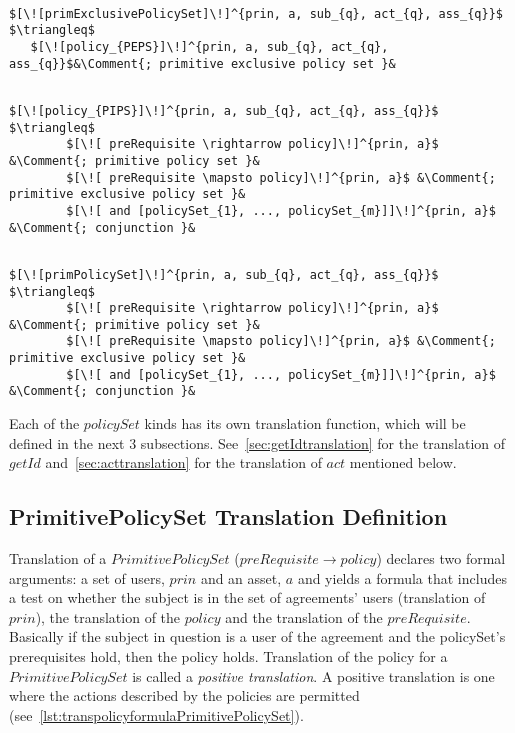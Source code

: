 \lstset{mathescape, language=AST}  
\begin{lstlisting}[frame=single, caption={Primitive Policy Set Translation Cases},label={lst:transpolicysetdefinitionAST}]

$[\![primExclusivePolicySet]\!]^{prin, a, sub_{q}, act_{q}, ass_{q}}$ $\triangleq$ 
   $[\![policy_{PEPS}]\!]^{prin, a, sub_{q}, act_{q}, ass_{q}}$&\Comment{; primitive exclusive policy set }&
\end{lstlisting}

\lstset{mathescape, language=AST}  
\begin{lstlisting}[frame=single, caption={Primitive Policy Set Translation Cases},label={lst:transpolicysetdefinitionAST}]

$[\![policy_{PIPS}]\!]^{prin, a, sub_{q}, act_{q}, ass_{q}}$ $\triangleq$ 
        $[\![ preRequisite \rightarrow policy]\!]^{prin, a}$ &\Comment{; primitive policy set }&
        $[\![ preRequisite \mapsto policy]\!]^{prin, a}$ &\Comment{; primitive exclusive policy set }&
        $[\![ and [policySet_{1}, ..., policySet_{m}]]\!]^{prin, a}$ &\Comment{; conjunction }&

\end{lstlisting}


\lstset{mathescape, language=AST}  
\begin{lstlisting}[frame=single, caption={Primitive Policy Set Translation Cases},label={lst:transpolicysetdefinitionAST}]

$[\![primPolicySet]\!]^{prin, a, sub_{q}, act_{q}, ass_{q}}$ $\triangleq$ 
        $[\![ preRequisite \rightarrow policy]\!]^{prin, a}$ &\Comment{; primitive policy set }&
        $[\![ preRequisite \mapsto policy]\!]^{prin, a}$ &\Comment{; primitive exclusive policy set }&
        $[\![ and [policySet_{1}, ..., policySet_{m}]]\!]^{prin, a}$ &\Comment{; conjunction }&

\end{lstlisting}

Each of the $policySet$ kinds has its own translation function, which will be defined in the next 3 subsections. See~\ref{sec:getIdtranslation} for the translation of $getId$ and~\ref{sec:acttranslation} for the translation of $act$ mentioned below.


\subsection{PrimitivePolicySet Translation Definition}
Translation of a $PrimitivePolicySet$ ($preRequisite \rightarrow policy$) declares two formal arguments: a set of users, $prin$ and an asset, $a$ and yields a formula that includes a test on whether the subject is in the set of agreements' users (translation of $prin$), the translation of the $policy$ and the translation of the $preRequisite$. Basically if the subject in question is a user of the agreement and the policySet's prerequisites hold, then the policy holds. Translation of the policy for a $PrimitivePolicySet$ is called a \emph{positive translation}. A positive translation is one where the actions described by the policies are permitted (see~\ref{lst:transpolicyformulaPrimitivePolicySet}).   

